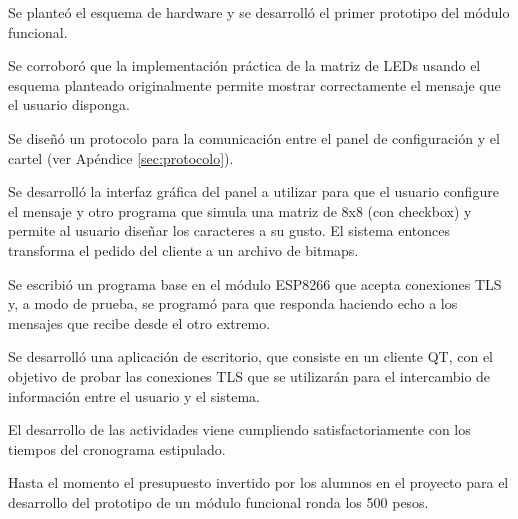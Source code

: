 Se planteó el esquema de hardware y se desarrolló el primer prototipo del módulo funcional.

Se corroboró que la implementación práctica de la matriz de LEDs usando el esquema planteado originalmente permite mostrar correctamente el mensaje que el usuario disponga.

Se diseñó un protocolo para la comunicación entre el panel de configuración y el cartel (ver Apéndice  \ref{sec:protocolo}).

Se desarrolló la interfaz gráfica del panel a utilizar para que el usuario configure el mensaje y otro programa que simula una matriz de 8x8 (con checkbox) y permite al usuario diseñar los caracteres a su gusto. El sistema entonces transforma el pedido del cliente a un archivo de bitmaps.

Se escribió un programa base en el módulo ESP8266 que acepta conexiones TLS y, a modo de prueba, se programó para que responda haciendo echo a los mensajes que recibe desde el otro extremo.

Se desarrolló una aplicación de escritorio, que consiste en un cliente QT, con el objetivo de probar las conexiones TLS que se utilizarán para el intercambio de información entre el usuario y el sistema.

El desarrollo de las actividades viene cumpliendo satisfactoriamente con los tiempos del cronograma estipulado.

Hasta el momento el presupuesto invertido por los alumnos en el proyecto para el desarrollo del prototipo de un módulo funcional ronda los 500 pesos.